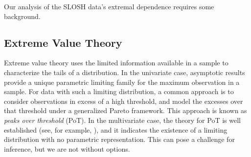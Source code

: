 Our analysis of the SLOSH data's extremal dependence requires some background.
\subsection{Extreme Value Theory\label{ref:evt}}
Extreme value theory uses the limited information available in a sample to
    characterize the tails of a distribution.  In the univariate case, asymptotic
    results provide a unique parametric limiting family for the maximum observation
    in a sample.  For data with such a limiting distribution, a common approach
    is to consider observations in excess of a high threshold, and model the
    excesses over that threshold under a generalized Pareto framework.  This
    approach is known as \emph{peaks over threshold} (PoT).  In the multivariate 
    case, the theory for PoT is well established (see, for example, 
    \cite{dehaan2006}), and it indicates the existence of a limiting distribution
    with no parametric representation.  This can pose a challenge for inference,
    but we are not without options.

